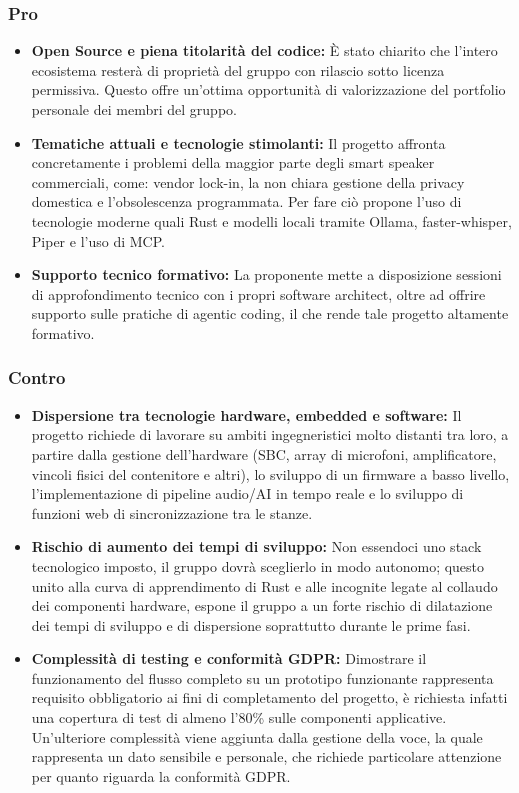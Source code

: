 \subsubsection{Pro}
\begin{itemize}
    \item \textbf{Open Source e piena titolarità del codice:} È stato chiarito che l'intero ecosistema  resterà di proprietà del gruppo con rilascio sotto licenza permissiva. Questo offre un'ottima opportunità di valorizzazione del portfolio personale dei membri del gruppo.
    \item \textbf{Tematiche attuali e tecnologie stimolanti:} Il progetto affronta concretamente i problemi della maggior parte degli smart speaker commerciali, come: vendor lock-in, la non chiara gestione della privacy domestica e l'obsolescenza programmata. Per fare ciò propone l'uso di tecnologie moderne quali Rust e modelli locali tramite Ollama, faster-whisper, Piper e l'uso di MCP.
    \item \textbf{Supporto tecnico formativo:} La proponente mette a disposizione sessioni di approfondimento tecnico con i propri software architect, oltre ad offrire supporto sulle pratiche di agentic coding, il che rende tale progetto altamente formativo.
\end{itemize}

\subsubsection{Contro}
\begin{itemize}
    \item \textbf{Dispersione tra tecnologie hardware, embedded e software:} Il progetto richiede di lavorare su ambiti ingegneristici molto distanti tra loro, a partire dalla gestione dell'hardware (SBC, array di microfoni, amplificatore, vincoli fisici del contenitore e altri), lo sviluppo di un firmware a basso livello, l'implementazione di pipeline audio/AI in tempo reale e lo sviluppo di funzioni web di sincronizzazione tra le stanze.
    \item \textbf{Rischio di aumento dei tempi di sviluppo:} Non essendoci uno stack tecnologico imposto, il gruppo dovrà sceglierlo in modo autonomo; questo unito alla curva di apprendimento di Rust e alle incognite legate al collaudo dei componenti hardware, espone il gruppo a un forte rischio di dilatazione dei tempi di sviluppo e di dispersione soprattutto durante le prime fasi.
    \item \textbf{Complessità di testing e conformità GDPR:} Dimostrare il funzionamento del flusso completo su un prototipo funzionante rappresenta requisito obbligatorio ai fini di completamento del progetto, è richiesta infatti una copertura di test di almeno l'80\% sulle componenti applicative. Un'ulteriore complessità viene aggiunta dalla gestione della voce, la quale rappresenta un dato sensibile e personale, che richiede particolare attenzione per quanto riguarda la conformità GDPR.
\end{itemize}

